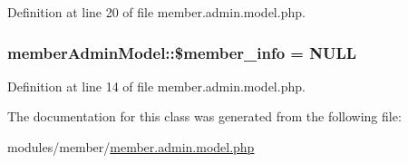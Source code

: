 Definition at line 20 of file member.\+admin.\+model.\+php.

\hypertarget{classmemberAdminModel_a4d4a6cc79e642c4dfabcf5f6666991b2}{
\subsubsection[{\$member\+\_\+info}]{\setlength{\rightskip}{0pt plus 5cm}member\+Admin\+Model\+::\$member\+\_\+info = N\+U\+L\+L}}\label{classmemberAdminModel_a4d4a6cc79e642c4dfabcf5f6666991b2}


Definition at line 14 of file member.\+admin.\+model.\+php.



The documentation for this class was generated from the following file\+:\begin{DoxyCompactItemize}
\item 
modules/member/\hyperlink{member_8admin_8model_8php}{member.\+admin.\+model.\+php}\end{DoxyCompactItemize}
